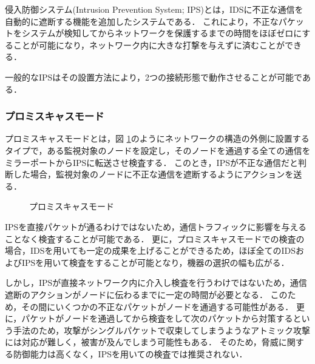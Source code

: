 侵入防御システム(Intrusion Prevention System; IPS)とは，IDSに不正な通信を自動的に遮断する機能を追加したシステムである．
これにより，不正なパケットをシステムが検知してからネットワークを保護するまでの時間をほぼゼロにすることが可能になり，ネットワーク内に大きな打撃を与えずに済むことができる．

一般的なIPSはその設置方法により，2つの接続形態で動作させることが可能である．

\subsubsection{プロミスキャスモード}

プロミスキャスモードとは，図 \ref{fig:2-1}のようにネットワークの構造の外側に設置するタイプで，ある監視対象のノードを設定し，そのノードを通過する全ての通信をミラーポートからIPSに転送させ検査する\cite{ciscoips}．
このとき，IPSが不正な通信だと判断した場合，監視対象のノードに不正な通信を遮断するようにアクションを送る．

\begin{figure}[tb]
	\begin{center}
		\caption{プロミスキャスモード}
		\label{fig:2-1}
	\end{center}
\end{figure}

IPSを直接パケットが通るわけではないため，通信トラフィックに影響を与えることなく検査することが可能である．
更に，プロミスキャスモードでの検査の場合，IDSを用いても一定の成果を上げることができるため，ほぼ全てのIDSおよびIPSを用いて検査をすることが可能となり，機器の選択の幅も広がる．

しかし，IPSが直接ネットワーク内に介入し検査を行うわけではないため，通信遮断のアクションがノードに伝わるまでに一定の時間が必要となる．
このため，その間にいくつかの不正なパケットがノードを通過する可能性がある．
更に，パケットがノードを通過してから検査をして次のパケットから対策するという手法のため，攻撃がシングルパケットで収束してしまうようなアトミック攻撃には対応が難しく，被害が及んでしまう可能性もある．
そのため，脅威に関する防御能力は高くなく，IPSを用いての検査では推奨されない．

